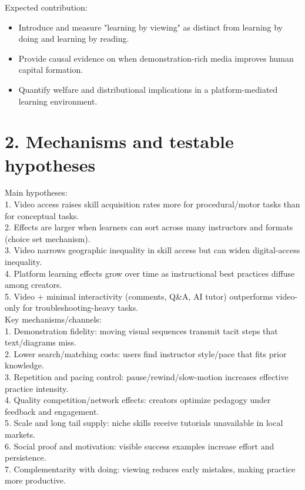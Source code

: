 \documentclass[11pt]{article}
\begin{document}
Expected contribution:\\
\begin{itemize}
\item Introduce and measure "learning by viewing" as distinct from learning by doing and learning by reading.
\item Provide causal evidence on when demonstration-rich media improves human capital formation.
\item Quantify welfare and distributional implications in a platform-mediated learning environment.
\end{itemize}

\section*{2. Mechanisms and testable hypotheses}
Main hypotheses:\\
1. Video access raises skill acquisition rates more for procedural/motor tasks than for conceptual tasks.\\
2. Effects are larger when learners can sort across many instructors and formats (choice set mechanism).\\
3. Video narrows geographic inequality in skill access but can widen digital-access inequality.\\
4. Platform learning effects grow over time as instructional best practices diffuse among creators.\\
5. Video + minimal interactivity (comments, Q\&A, AI tutor) outperforms video-only for troubleshooting-heavy tasks.\\

Key mechanisms/channels:\\
1. Demonstration fidelity: moving visual sequences transmit tacit steps that text/diagrams miss.\\
2. Lower search/matching costs: users find instructor style/pace that fits prior knowledge.\\
3. Repetition and pacing control: pause/rewind/slow-motion increases effective practice intensity.\\
4. Quality competition/network effects: creators optimize pedagogy under feedback and engagement.\\
5. Scale and long tail supply: niche skills receive tutorials unavailable in local markets.\\
6. Social proof and motivation: visible success examples increase effort and persistence.\\
7. Complementarity with doing: viewing reduces early mistakes, making practice more productive.\\
\end{document}
